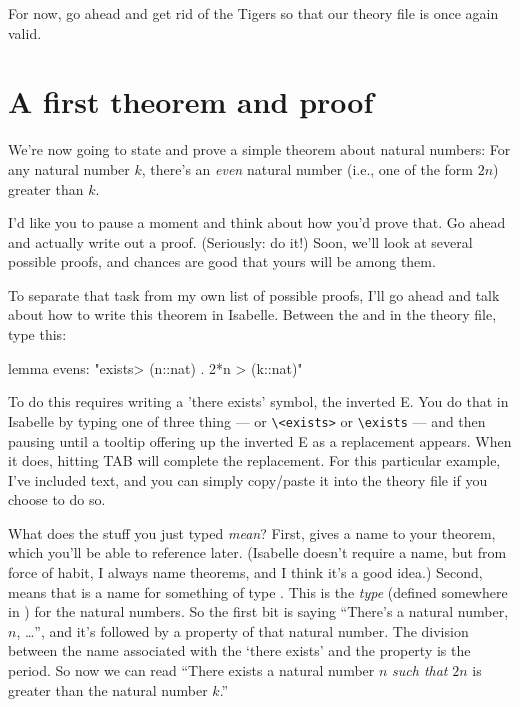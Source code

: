 \task
For now, go ahead and get rid of the Tigers so that our theory file is once again valid. 
\etask

\section{A first theorem and proof}
We're now going to state and prove a simple theorem about natural numbers: For any natural number $k$, there's an \textit{even} natural number (i.e., one of the form $2n$) greater than $k$. 

\task I'd like you to pause a moment and think about how you'd prove that. Go ahead and actually write out a proof. (Seriously: do it!) Soon, we'll look at several possible proofs, and chances are good that yours will be among them. 
\etask

To separate that task from my own list of possible proofs, I'll go ahead and talk about how to write this theorem in Isabelle. Between the  and  in the theory file, type this: 
\begin{IS}
lemma evens: "\<exists> (n::nat) . 2*n > (k::nat)"
\end{IS}

To do this requires writing a 'there exists' symbol, the inverted E. You do that in Isabelle by typing one of three thing ---
 or \verb|\<exists>| or \verb|\exists| --- and then pausing until a tooltip offering up the inverted E as a replacement appears. When it does, hitting TAB will complete the replacement. For this particular example, I've included text, and you can simply copy/paste it into the theory file if you choose to do so.

What does the stuff you just typed \textit{mean}? First,  gives a name to your theorem, which you'll be able to reference later. (Isabelle doesn't require a name, but from force of habit, I always name theorems, and I think it's a good idea.) Second,  means that  is a name for something of type . This  is the \textit{type} (defined somewhere in ) for the natural numbers. So the first bit is saying ``There's a natural number, $n$, \ldots'', and it's followed by a property of that natural number. The division between the name associated with the `there exists' and the property is the period. So now we can read ``There exists a natural number $n$ \textit{such that} $2n$ is greater than the natural number $k$.'' 

